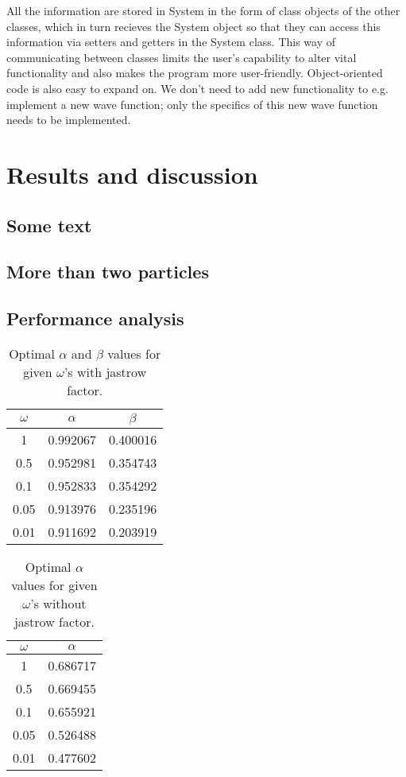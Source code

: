 \documentclass[english, a4paper]{article}
\begin{document}
\noindent All the information are stored in System in the form of class objects of the other classes, which in turn 
recieves the System object so that they can access this information via
setters and getters in the System class. This way of communicating between classes limits the user's 
capability to alter vital functionality and also makes the program more user-friendly. 
Object-oriented code is also easy to expand on. We don't need to add new functionality to
e.g. implement a new wave function; only the specifics of this new wave function needs to be implemented. 

\section{Results and discussion}


\subsection{Some text}

\subsection{More than two particles}

\subsection{Performance analysis}


\begin{table}[H]
\caption{Optimal $\alpha$ and  $\beta$ values for given $\omega$'s  with jastrow factor.}
\centering
\begin{tabular}{ c c c }
\hline
\hline
  $\omega$ & $\alpha$ & $\beta$ \\
  \hline
1    & 0.992067 & 0.400016\\
0.5  & 0.952981 & 0.354743\\
0.1  & 0.952833 & 0.354292\\
0.05 & 0.913976 & 0.235196\\
0.01 & 0.911692 & 0.203919\\
\hline
\hline
\end{tabular}
\end{table}

\begin{table}[H]
\caption{Optimal $\alpha$ values for given $\omega$'s  without jastrow factor.}
\centering
\begin{tabular}{ c c }
\hline
\hline
  $\omega$ & $\alpha$ \\
  \hline
1    & 0.686717\\
0.5  & 0.669455\\
0.1  & 0.655921\\
0.05 & 0.526488\\
0.01 & 0.477602\\
\hline
\hline
\end{tabular}
\end{table}
\end{document}
